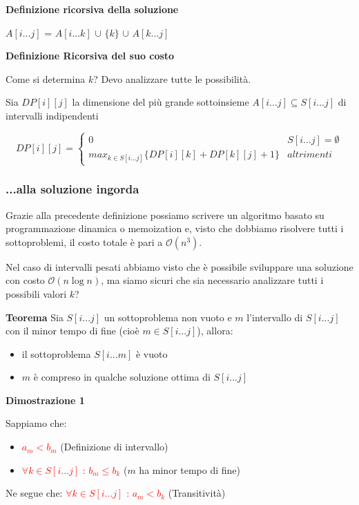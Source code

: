 \documentclass[../cheatSheetAlgoritmi.tex]{subfiles}
\begin{document}
\hfill \break
\textbf{Definizione ricorsiva della soluzione}

$A[i...j]$ = $A[i...k]$ $\cup$ $\{k\}$ $\cup$ $A[k...j]$

\hfill \break
\textbf{Definizione Ricorsiva del suo costo}

Come si determina $k$? Devo analizzare tutte le possibilità.

Sia $DP[i][j]$ la dimensione del più grande sottoinsieme $A[i...j] \subseteq S[i...j]$ di intervalli indipendenti
\begin{center}
	\begin{equation*}
  		DP[i][j]=\begin{cases}
    		0  & \text{$S[i...j] = \emptyset$}\\
    		max_{k \in S[i...j]}\{DP[i][k] + DP[k][j] + 1\} & \text{$altrimenti$}
  		\end{cases}
	\end{equation*}
\end{center}
\subsubsection{...alla soluzione ingorda}
Grazie alla precedente definizione possiamo scrivere un algoritmo basato su programmazione dinamica o memoization e, visto che dobbiamo risolvere tutti i sottoproblemi, il costo totale è pari a $\mathcal{O}(n^3)$.

Nel caso di intervalli pesati abbiamo visto che è possibile sviluppare una soluzione con costo $\mathcal{O}(n\log{n})$, ma siamo sicuri che sia necessario analizzare tutti i possibili valori $k$?

\bigskip

\textbf{Teorema}
\hfill \break
Sia $S[i...j]$ un sottoproblema non vuoto e $m$ l'intervallo di $S[i ...j]$ con il minor tempo di fine (cioè $m \in S[i...j] $), allora:
\begin{itemize}
	\item il sottoproblema $S[i...m]$ è vuoto
	\item $m$ è compreso in qualche soluzione ottima di $S[i ...j]$
\end{itemize}
\newpage
\begin{flushleft}
\textbf{Dimostrazione 1}
\end{flushleft}
Sappiamo che:
\begin{itemize}
	\item  \textcolor{red}{$a_m < b_m$} (Definizione di intervallo)
	\item \textcolor{red}{$\forall k \in S[i...j]$ : $b_m \leq b_k$} ($m$ ha minor tempo di fine)
\end{itemize}
Ne segue che: \textcolor{red}{$\forall k \in S[i...j]$ : $a_m < b_k$} (Transitività)
\end{document}
